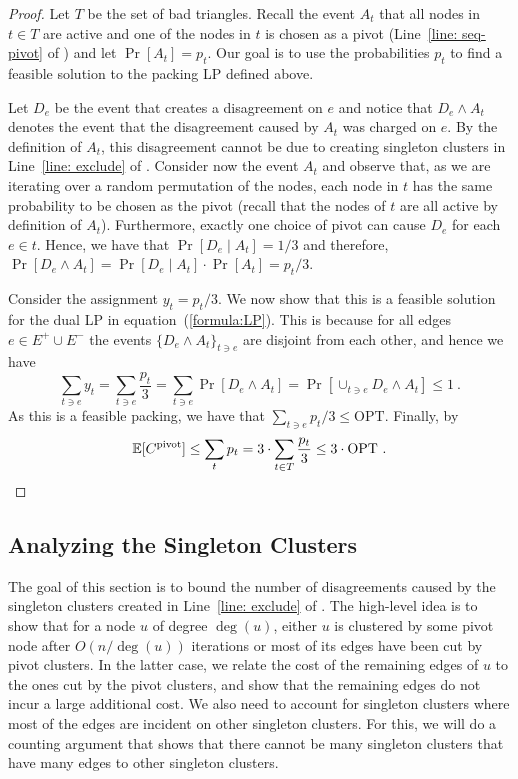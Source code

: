 \documentclass[10pt,a4paper]{article}
\newcommand{\E}{\mathbb{E}}
\newcommand{\lp}{\textrm{LP}\xspace}
\newcommand{\ourcluster}{\ensuremath{C^{\textrm{pivot}}}\xspace}
\newcommand{\opt}{\textrm{OPT}\xspace}
\begin{document}
\begin{proof}
Let $T$ be the set of bad triangles.
Recall the event $A_t$ that all nodes in $t \in T$ are active and one of the nodes in $t$ is chosen as a pivot (Line~\ref{line: seq-pivot} of ) and let $\Pr[A_t] = p_t$.
Our goal is to use the probabilities $p_t$ to find a feasible solution to the packing \lp defined above.

Let $D_e$ be the event that  creates a disagreement on $e$ and notice that $D_e \land A_t$ denotes the event that the disagreement caused by $A_t$ was charged on $e$.
By the definition of $A_t$, this disagreement cannot be due to creating singleton clusters in Line~\ref{line: exclude} of .
Consider now the event $A_t$ and observe that, as we are iterating over a random permutation of the nodes, each node in $t$ has the same probability to be chosen as the pivot (recall that the nodes of $t$ are all active by definition of $A_t$).
Furthermore, exactly one choice of pivot can cause $D_e$ for each $e \in t$.
Hence, we have that $\Pr[D_e \mid A_t] = 1/3$ and therefore, $\Pr[D_e \land A_t] = \Pr[D_e \mid A_t] \cdot \Pr[A_t] = p_t/3$.

  Consider the assignment $y_{t} = p_{t}/3$. 
  We now show that this is a feasible solution for the dual \lp in equation~(\ref{formula:LP}). This is because for all edges $e \in E^{+} \cup E^{-}$ the events $\{D_{e} \land A_{t}\}_{t \ni e}$ are disjoint from each other, and hence we have 
  \[
    \sum_{t \ni e} y_{t} = \sum_{t \ni e} \frac{p_{t}}{3} = \sum_{t \ni e}\Pr[D_{e} \land A_{t}] = \Pr[\cup_{t \ni e}D_{e} \land A_{t}] \le 1 \ .
  \]
  As this is a feasible packing, we have that $\sum_{t \ni e} p_{t}/3 \leq \opt$.
  Finally, by  
  \[
    \E[\ourcluster] \leq \sum_{t} p_t = 3 \cdot \sum_{t \in T} \frac{p_t}{3} \leq 3 \cdot \opt \ . \qedhere
  \]
\end{proof}


\subsection{Analyzing the Singleton Clusters}\label{sec: singleton}

The goal of this section is to bound the number of disagreements caused by the singleton clusters created in Line~\ref{line: exclude} of .
The high-level idea is to show that for a node $u$ of degree $\deg(u)$, either $u$ is clustered by some pivot node after $O(n / \deg(u))$ iterations or most of its edges have been cut by pivot clusters.
In the latter case, we relate the cost of the remaining edges of $u$ to the ones cut by the pivot clusters, and show that the remaining edges do not incur a large additional cost.
We also need to account for singleton clusters where most of  the edges are incident on other singleton clusters.
For this, we will do a counting argument that shows that there cannot be many singleton clusters that have many edges to other singleton clusters.
\end{document}
